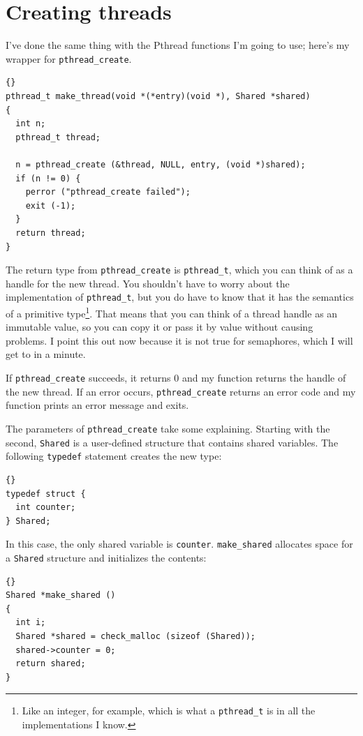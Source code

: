 \documentclass{book}
\begin{document}
\section{Creating threads}

I've done the same thing with the Pthread functions I'm going to use;
here's my wrapper for {\tt pthread\_create}.

\begin{lstlisting}[caption={}]{}
pthread_t make_thread(void *(*entry)(void *), Shared *shared)
{
  int n;
  pthread_t thread;

  n = pthread_create (&thread, NULL, entry, (void *)shared);
  if (n != 0) {
    perror ("pthread_create failed");
    exit (-1);
  }
  return thread;
}
\end{lstlisting}

The return type from {\tt pthread\_create} is {\tt pthread\_t},
which you can think of as a handle for the new thread.  You
shouldn't have to worry about the implementation of {\tt pthread\_t},
but you do have to know that it has the semantics of a primitive
type\footnote{Like an integer, for example, which is what a
{\tt pthread\_t} is in all the implementations I know.}.  That
means that you can think of a thread handle as an immutable
value, so you can copy it or pass it by value without causing
problems.  I point this out now because it is not true for
semaphores, which I will get to in a minute.

If {\tt pthread\_create} succeeds, it returns 0 and my function
returns the handle of the new thread.
If an error occurs, {\tt pthread\_create} 
returns an error code and my function prints an error message
and exits.

The parameters of {\tt pthread\_create} take some
explaining.  Starting with the second,
{\tt Shared}
is a user-defined structure that contains shared variables.
The following {\tt typedef} statement creates the new type:

\begin{lstlisting}[caption={}]{}
typedef struct {
  int counter;
} Shared;
\end{lstlisting}

In this case, the only shared variable is {\tt counter}.
{\tt make\_shared} allocates
space for a {\tt Shared} structure and initializes the contents:

\begin{lstlisting}[caption={}]{}
Shared *make_shared ()
{
  int i;
  Shared *shared = check_malloc (sizeof (Shared));
  shared->counter = 0;
  return shared;
}
\end{lstlisting}
\end{document}
